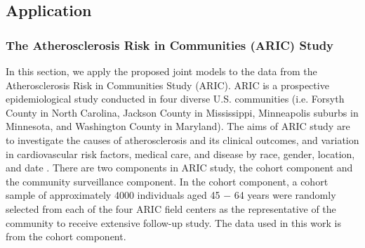 



% 
\subsection{Application}\label{sec:p3application}
\subsubsection{The Atherosclerosis Risk in Communities (ARIC) Study}\label{sec:p3data}
In this section, we apply the proposed joint models to the data from the Atherosclerosis Risk in Communities Study (ARIC). ARIC is a prospective epidemiological study conducted in four diverse U.S. communities (i.e. Forsyth County in North Carolina, Jackson County in Mississippi, Minneapolis suburbs in Minnesota, and Washington County in Maryland). The aims of ARIC study are to investigate the causes of atherosclerosis and its clinical outcomes, and variation in cardiovascular risk factors, medical care, and disease by race, gender, location, and date \citep{aric1989atherosclerosis}. There are two components in ARIC study, the cohort component and the community surveillance component. In the cohort component, a cohort sample of approximately 4000 individuals aged 45 $-$ 64 years were randomly selected from each of the four ARIC field centers as the representative of the community to receive extensive follow-up study. The data used in this work is from the cohort component.

